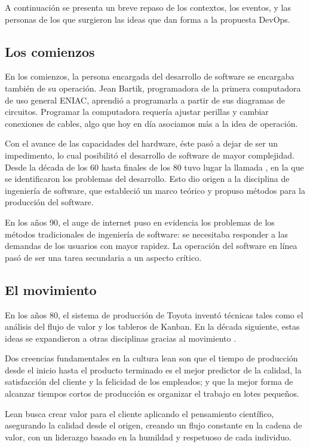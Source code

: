 A continuación se presenta un breve repaso de los contextos, los
eventos, y las personas de los que surgieron las ideas que dan forma a
la propuesta DevOps.
%
\subsection{Los comienzos}
%
En los comienzos, la persona encargada del desarrollo de software se
encargaba también de su operación. Jean Bartik, programadora de la
primera computadora de uso general ENIAC, aprendió a programarla a
partir de sus diagramas de circuitos. Programar la computadora
requería ajustar perillas y cambiar conexiones de cables, algo que hoy
en día asociamos más a la idea de operación.

Con el avance de las capacidades del hardware, éste pasó a dejar de
ser un impedimento, lo cual posibilitó el desarrollo de software de
mayor complejidad. Desde la década de los 60 hasta finales de los 80
tuvo lugar la llamada , en la que se
identificaron los problemas del desarrollo. Esto dio origen a la
disciplina de ingeniería de software, que estableció un marco teórico
y propuso métodos para la producción del software.

En los años 90, el auge de internet puso en evidencia los problemas de
los métodos tradicionales de ingeniería de software: se necesitaba
responder a las demandas de los usuarios con mayor rapidez. La
operación del software en línea pasó de ser una tarea secundaria a un
aspecto crítico.
%
\subsection{El movimiento }
%
En los años 80, el sistema de producción de Toyota inventó técnicas
tales como el análisis del flujo de valor y los tableros de Kanban. En
la década siguiente, estas ideas se expandieron a otras disciplinas
gracias al movimiento .

Dos creencias fundamentales en la cultura lean son que el tiempo de
producción desde el inicio hasta el producto terminado es el mejor
predictor de la calidad, la satisfacción del cliente y la felicidad de
los empleados; y que la mejor forma de alcanzar tiempos cortos de
producción es organizar el trabajo en lotes pequeños.

Lean busca crear valor para el cliente aplicando el pensamiento
científico, asegurando la calidad desde el origen, creando un flujo
constante en la cadena de valor, con un liderazgo basado en la
humildad y respetuoso de cada individuo.
%

